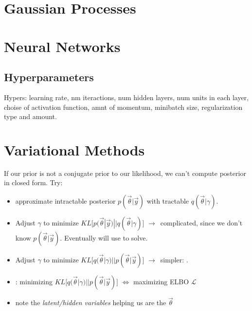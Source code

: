 \documentclass[11pt]{article}
\begin{document}
\section{Gaussian Processes}
\label{sec:gp}



\section{Neural Networks}
\label{sec:nn}

\subsection{Hyperparameters}
Hypers: learning rate, nm iteractions, num hidden layers, num units in
each layer, choise of activation function, amnt of momentum, minibatch size,
regularization type and amount.



\section{Variational Methods}
\label{sec:var_meth}

If our prior is not a conjugate prior to our likelihood, we can't compute
posterior in closed form. Try:

\begin{itemize}
  \item approximate intractable posterior $p(\vec{\theta} | \vec{y})$ with tractable
  $q(\vec{\theta} | \gamma)$.
  \item Adjust $\gamma$ to minimize
  $KL \big[p(\vec{\theta} | \vec{y}) || q(\vec{\theta} | \gamma)\big]$ $\to\,$
  complicated, since we don't know $p(\vec{\theta} | \vec{y})$. Eventually will
  use  to solve.
  \item Adjust $\gamma$ to minimize
  $KL \big[q(\vec{\theta} | \gamma) || p(\vec{\theta} | \vec{y})\big]$ $\to\,$
  simpler: .
  \item {}: minimizing $KL \big[q(\vec{\theta} | \gamma) ||
  p(\vec{\theta} | \vec{y})\big]$ $\iff$ maximizing ELBO $\mathcal{L}$
  \item note the \emph{latent/hidden variables} helping us are the $\vec{\theta}$
\end{itemize}
\end{document}
